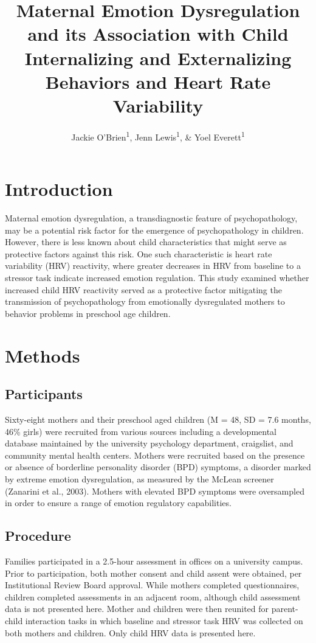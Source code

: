 \documentclass[man]{apa6}
\title{Maternal Emotion Dysregulation and its Association with Child
Internalizing and Externalizing Behaviors and Heart Rate Variability}
\author{Jackie O'Brien\textsuperscript{1}, Jenn Lewis\textsuperscript{1}, \&
Yoel Everett\textsuperscript{1}}
\date{}
\affiliation{
\vspace{0.5cm}
\textsuperscript{1} University of Oregon}
\begin{document}
\maketitle

\section{Introduction}\label{introduction}

Maternal emotion dysregulation, a transdiagnostic feature of
psychopathology, may be a potential risk factor for the emergence of
psychopathology in children. However, there is less known about child
characteristics that might serve as protective factors against this
risk. One such characteristic is heart rate variability (HRV)
reactivity, where greater decreases in HRV from baseline to a stressor
task indicate increased emotion regulation. This study examined whether
increased child HRV reactivity served as a protective factor mitigating
the transmission of psychopathology from emotionally dysregulated
mothers to behavior problems in preschool age children.

\section{Methods}\label{methods}

\subsection{Participants}\label{participants}

Sixty-eight mothers and their preschool aged children (M = 48, SD = 7.6
months, 46\% girls) were recruited from various sources including a
developmental database maintained by the university psychology
department, craigslist, and community mental health centers. Mothers
were recruited based on the presence or absence of borderline
personality disorder (BPD) symptoms, a disorder marked by extreme
emotion dysregulation, as measured by the McLean screener (Zanarini et
al., 2003). Mothers with elevated BPD symptoms were oversampled in order
to ensure a range of emotion regulatory capabilities.

\subsection{Procedure}\label{procedure}

Families participated in a 2.5-hour assessment in offices on a
university campus. Prior to participation, both mother consent and child
assent were obtained, per Institutional Review Board approval. While
mothers completed questionnaires, children completed assessments in an
adjacent room, although child assessment data is not presented here.
Mother and children were then reunited for parent-child interaction
tasks in which baseline and stressor task HRV was collected on both
mothers and children. Only child HRV data is presented here.
\end{document}
